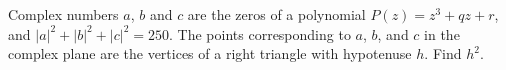 Complex numbers $a$, $b$ and $c$ are the zeros of a polynomial $P(z) = z^3+qz+r$, and $|a|^2+|b|^2+|c|^2=250$.  The points corresponding to $a$, $b$, and $c$ in the complex plane are the vertices of a right triangle with hypotenuse $h$.  Find $h^2$.